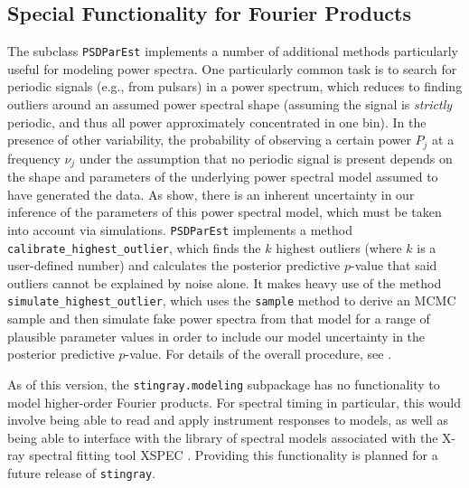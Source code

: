 \documentclass[twocolumn]{aastex62}
\newcommand{\stingray}{\texttt{stingray}\xspace}
\begin{document}
\subsection{Special Functionality for Fourier Products}

The subclass \verb|PSDParEst| implements a number of additional methods particularly useful for modeling power spectra. 
One particularly common task is to search for periodic signals (e.g., from pulsars) in a power spectrum, which reduces to finding outliers around an assumed power spectral shape (assuming the signal is \textit{strictly} periodic, and thus all power approximately concentrated in one bin). 
In the presence of other variability, the probability of observing a certain power $P_j$ at a frequency $\nu_j$ under the assumption that no periodic signal is present depends on the shape and parameters of the underlying power spectral model assumed to have generated the data. 
As \citet{vaughan2010} show, there is an inherent uncertainty in our inference of the parameters of this power spectral model, which must be taken into account via simulations. 
\verb|PSDParEst| implements a method \verb|calibrate_highest_outlier|, which finds the $k$ highest outliers (where $k$ is a user-defined number) and calculates the posterior predictive $p$-value that said outliers cannot be explained by noise alone. 
It makes heavy use of the method \verb|simulate_highest_outlier|, which uses the \verb|sample| method to derive an MCMC sample and then simulate fake power spectra from that model for a range of plausible parameter values in order to include our model uncertainty in the posterior predictive $p$-value. 
For details of the overall procedure, see \citet{vaughan2010}. 

As of this version, the \verb|stingray.modeling| subpackage has no functionality to model higher-order Fourier products. 
For spectral timing in particular, this would involve being able to read and apply instrument responses to models, as well as being able to interface with the library of spectral models associated with the X-ray spectral fitting tool XSPEC \citep{arnaud1996}. 
Providing this functionality is planned for a future release of \stingray. 
\end{document}
